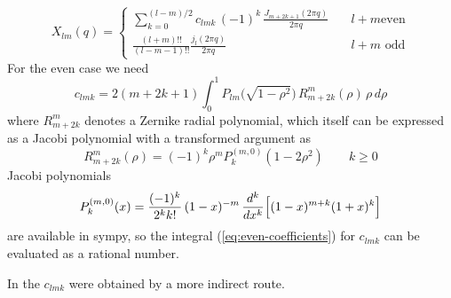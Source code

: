 \begin{equation}
  X_{lm}(q) =
  \begin{cases}
    \displaystyle
    \sum_{k=0}^{(l-m)/2} c_{lmk}\, (-1)^k\, \frac{J_{m+2k+1}(2\pi q)}{2\pi q}
    & \quad l+m \text{even}   \\[16pt]
    \displaystyle
    \frac{(l+m)!!}{(l-m-1)!!} \frac{j_l(2\pi q)}{2\pi q}
    & \quad l+m \text{ odd}
  \end{cases}
  \label{eq:oddeven-radial}
\end{equation}
For the even case we need
\begin{equation}
  c_{lmk} = 2(m+2k+1) \int_0^1 P_{lm}\bigl(\sqrt{1-\rho^2}\bigr)\,
  R_{m+2k}^m(\rho)\, \rho\, d\rho
  \label{eq:even-coefficients}
\end{equation}
where $R_{m+2k}^m$ denotes a Zernike radial polynomial, which itself
can be expressed as a Jacobi polynomial with a transformed argument as
\begin{equation}
  R_{m+2k}^m(\rho) = (-1)^{k} \rho^m P_k^{(m,0)}\!\left(1-2\rho^2\right)
  \qquad k \ge 0
  \label{eq:zernike-jacobi}
\end{equation}
Jacobi polynomials
\begin{equation}
  P_k^{(m,0)}(x) = \frac{(-1)^{k}}{2^{k}k!}\,(1-x)^{-m}\,
  \frac{d^{k}}{dx^{k}}\Bigl[(1-x)^{m+k}(1+x)^{k}\Bigr]
  \label{eq:jacobi-rodrigues}
\end{equation}
are available in sympy, so the integral (\ref{eq:even-coefficients})
for $c_{lmk}$ can be evaluated as a rational number.

In \cite{2026PASP..138e4504D} the $c_{lmk}$ were obtained by a more
indirect route.
